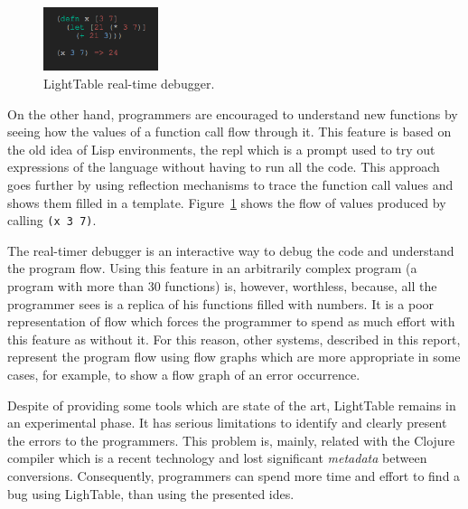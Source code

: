 \begin{figure}
  \vspace{-25pt}
  \begin{center}
    \includegraphics[width=0.3\textwidth]{img/eval-close}
  \end{center}
  \vspace{-20pt}
 \caption{LightTable real-time debugger.}  
  \vspace{-20pt}
    \label{fig:lt2}
\end{figure}

On the other hand, programmers are encouraged to understand new functions by seeing how the values of a function call flow through it. This feature is based on the old idea of Lisp environments, the \ac{repl} which is a prompt used to try out expressions of the language without having to run all the code. This approach goes further by using reflection mechanisms to trace the function call values and shows them filled in a template. Figure~\ref{fig:lt2} shows the flow of values produced by calling \texttt{(x 3 7)}.

The real-timer debugger is an interactive way to debug the code and understand the program flow. Using this feature in an arbitrarily complex program (a program with more than 30 functions) is, however, worthless, because, all the programmer sees is a replica of his functions filled with numbers. It is a poor representation of flow which forces the programmer to spend as much effort with this feature as without it. For this reason, other systems, described in this report, represent the program flow using flow graphs which are more appropriate in some cases, for example, to show a flow graph of an error occurrence. 

Despite of providing some tools which are state of the art, LightTable remains in an experimental phase. It has serious limitations to identify and clearly present the errors to the programmers. This problem is, mainly, related with the Clojure compiler which is a recent technology and lost significant \textit{metadata} between conversions. Consequently, programmers can spend more time and effort to find a bug using LighTable, than using the presented \ac{ide}s.
